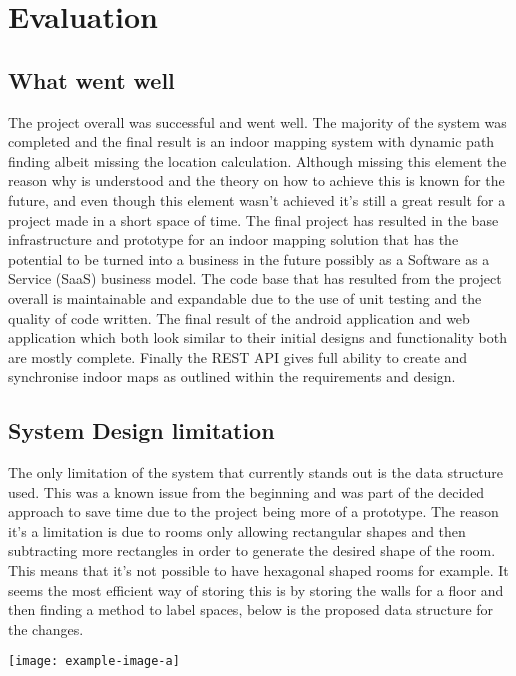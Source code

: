 \section{Evaluation}
\subsection{What went well} %
The project overall was successful and went well. The majority of the system was completed and the final result is an indoor mapping system with dynamic path finding albeit missing the location calculation. Although missing this element the reason why is understood and the theory on how to achieve this is known for the future, and even though this element wasn't achieved it's still a great result for a project made in a short space of time. The final project has resulted in the base infrastructure and prototype for an indoor mapping solution that has the potential to be turned into a business in the future possibly as a Software as a Service (SaaS) business model. The code base that has resulted from the project overall is maintainable and expandable due to the use of unit testing and the quality of code written. The final result of the android application and web application which both look similar to their initial designs and functionality both are mostly complete. Finally the REST API gives full ability to create and synchronise indoor maps as outlined within the requirements and design.

\subsection{System Design limitation}
The only limitation of the system that currently stands out is the data structure used. This was a known issue from the beginning and was part of the decided approach to save time due to the project being more of a prototype. The reason it's a limitation is due to rooms only allowing rectangular shapes and then subtracting more rectangles in order to generate the desired shape of the room. This means that it's not possible to have hexagonal shaped rooms for example. It seems the most efficient way of storing this is by storing the walls for a floor and then finding a method to label spaces, below is the proposed data structure for the changes.

\begin{center}
	\texttt{[image: example-image-a]}
\end{center}

